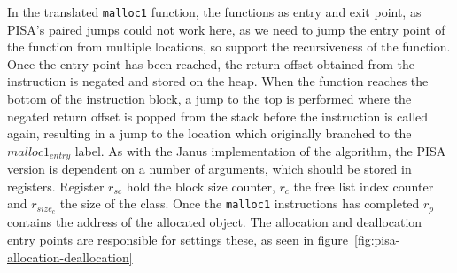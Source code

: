 In the translated \texttt{malloc1} function, the  functions as entry and exit point, as PISA's paired jumps could not work here, as we need to jump the entry point of the function from multiple locations, so support the recursiveness of the function. Once the entry point has been reached, the return offset obtained from the  instruction is negated and stored on the heap. When the function reaches the bottom of the instruction block, a jump to the top is performed where the negated return offset is popped from the stack before the  instruction is called again, resulting in a jump to the location which originally branched to the \textit{$malloc1_{entry}$} label. As with the Janus implementation of the algorithm, the PISA version is dependent on a number of arguments, which should be stored in registers. Register $r_{sc}$ hold the block size counter, $r_c$ the free list index counter and $r_{size_c}$ the size of the class. Once the \texttt{malloc1} instructions has completed $r_p$ contains the address of the allocated object. The allocation and deallocation entry points are responsible for settings these, as seen in figure~\ref{fig:pisa-allocation-deallocation}

